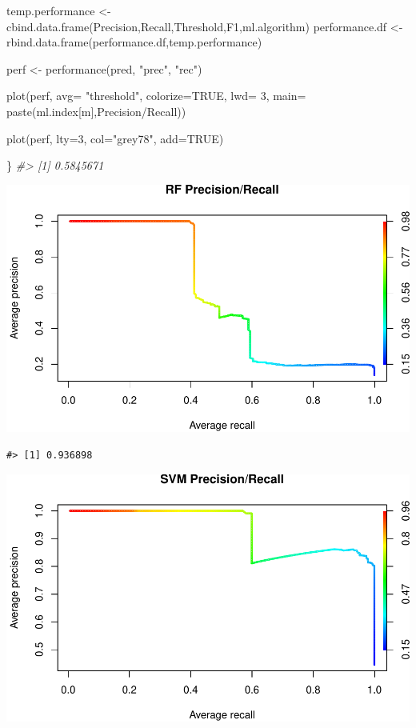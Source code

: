 \documentclass[
]{book}
\newenvironment{Shaded}{\begin{snugshade}}{\end{snugshade}}
\newcommand{\AttributeTok}[1]{\textcolor[rgb]{0.77,0.63,0.00}{#1}}
\newcommand{\CommentTok}[1]{\textcolor[rgb]{0.56,0.35,0.01}{\textit{#1}}}
\newcommand{\ConstantTok}[1]{\textcolor[rgb]{0.00,0.00,0.00}{#1}}
\newcommand{\DecValTok}[1]{\textcolor[rgb]{0.00,0.00,0.81}{#1}}
\newcommand{\FunctionTok}[1]{\textcolor[rgb]{0.00,0.00,0.00}{#1}}
\newcommand{\NormalTok}[1]{#1}
\newcommand{\OtherTok}[1]{\textcolor[rgb]{0.56,0.35,0.01}{#1}}
\newcommand{\StringTok}[1]{\textcolor[rgb]{0.31,0.60,0.02}{#1}}
\begin{document}
\begin{Shaded}
\begin{Highlighting}[]
\NormalTok{  temp.performance }\OtherTok{\textless{}{-}} \FunctionTok{cbind.data.frame}\NormalTok{(Precision,Recall,Threshold,F1,ml.algorithm)}
\NormalTok{  performance.df }\OtherTok{\textless{}{-}} \FunctionTok{rbind.data.frame}\NormalTok{(performance.df,temp.performance)}
  
\NormalTok{  perf }\OtherTok{\textless{}{-}} \FunctionTok{performance}\NormalTok{(pred, }\StringTok{"prec"}\NormalTok{, }\StringTok{"rec"}\NormalTok{)}

  \FunctionTok{plot}\NormalTok{(perf,}
     \AttributeTok{avg=} \StringTok{"threshold"}\NormalTok{,}
     \AttributeTok{colorize=}\ConstantTok{TRUE}\NormalTok{,}
     \AttributeTok{lwd=} \DecValTok{3}\NormalTok{,}
     \AttributeTok{main=} \FunctionTok{paste}\NormalTok{(ml.index[m],}\StringTok{\textquotesingle{}Precision/Recall\textquotesingle{}}\NormalTok{))}
  
\FunctionTok{plot}\NormalTok{(perf,}
     \AttributeTok{lty=}\DecValTok{3}\NormalTok{,}
     \AttributeTok{col=}\StringTok{"grey78"}\NormalTok{,}
     \AttributeTok{add=}\ConstantTok{TRUE}\NormalTok{)}

\NormalTok{  \}  }
\CommentTok{\#\textgreater{} [1] 0.5845671}
\end{Highlighting}
\end{Shaded}

\includegraphics{gibbonR_tutorial_files/figure-latex/unnamed-chunk-13-1.pdf}

\begin{verbatim}
#> [1] 0.936898
\end{verbatim}

\includegraphics{gibbonR_tutorial_files/figure-latex/unnamed-chunk-13-2.pdf}
\end{document}
